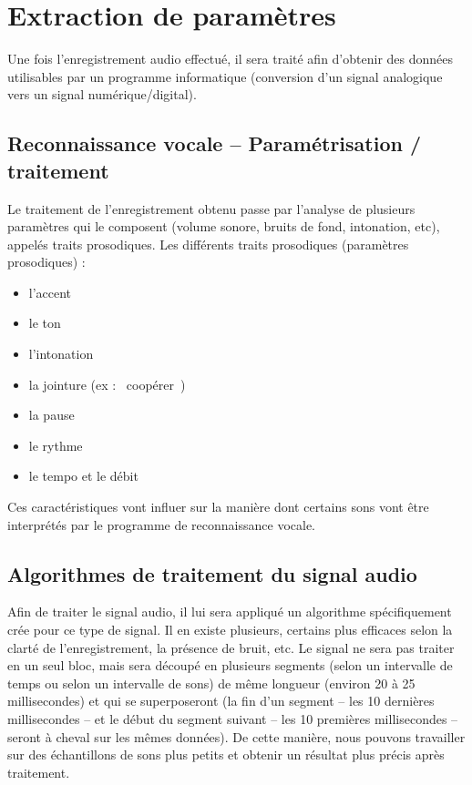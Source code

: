 \documentclass[a4paper, 12pt]{book}
\newcounter{program}[subsection]
\begin{document}

\section{Extraction de paramètres}

Une fois l’enregistrement audio effectué, il sera traité afin d’obtenir des données utilisables par un programme informatique (conversion d’un signal analogique vers un signal numérique/digital).

\subsection{Reconnaissance vocale – Paramétrisation / traitement}

Le traitement de l’enregistrement obtenu passe par l’analyse de plusieurs paramètres qui le composent (volume sonore, bruits de fond, intonation, etc), appelés traits prosodiques. Les différents traits prosodiques (paramètres prosodiques) :

\begin{itemize}
    \item l’accent 
    \item le ton 
    \item l’intonation 
    \item la jointure (ex : \guillemotleft{}~coopérer~\guillemotright{}) 
    \item la pause 
    \item le rythme
    \item le tempo et le débit
\end{itemize}

Ces caractéristiques vont influer sur la manière dont certains sons vont être interprétés par le programme de reconnaissance vocale.

\subsection{Algorithmes de traitement du signal audio}

Afin de traiter le signal audio, il lui sera appliqué un algorithme spécifiquement crée pour ce type de signal. Il en existe plusieurs, certains plus efficaces selon la clarté de l’enregistrement, la présence de bruit, etc. Le signal ne sera pas traiter en un seul bloc, mais sera découpé en plusieurs segments (selon un intervalle de temps ou selon un intervalle de sons) de même longueur (environ 20 à 25 millisecondes) et qui se superposeront (la fin d’un segment – les 10 dernières millisecondes – et le début du segment suivant – les 10 premières millisecondes – seront à cheval sur les mêmes données). De cette manière, nous pouvons travailler sur des échantillons de sons plus petits et obtenir un résultat plus précis après traitement.
\end{document}
